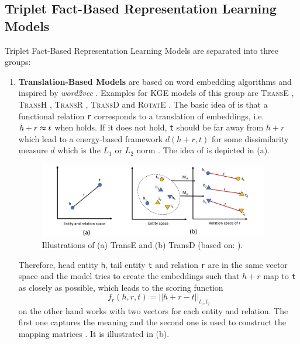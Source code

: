 \subsection{Triplet Fact-Based Representation Learning Models} 
\label{subsec:triplet_fact_based_representation_learning_models}

Triplet Fact-Based Representation Learning Models are separated into three groups:
\begin{enumerate}
    \item 
    \textbf{Translation-Based Models} are based on word embedding algorithms and inspired by \textit{word2vec} \cite{electronics9050750}.
    Examples for \ac{KGE} models of this group are \textsc{TransE} \cite{TransE}, \textsc{TransH} \cite{TransH}, \textsc{TransR} \cite{TransR}, \textsc{TransD} \cite{TransD}
    and 
    \textsc{RotatE} \cite{RotatE}.
    The basic idea of \transe is that a functional relation \texttt{r} corresponds to a translation of embeddings, i.e. $h + r \thickapprox t$ when  holds.
    If it does not hold, \texttt{t} should be far away from $h + r$ which lead to a energy-based framework $d(h+r, t)$ for some dissimilarity measure $d$ which is the $L_1$ or $L_2$ norm \cite{TransE}.
    The idea of \transe is depicted in  (a).
    \begin{figure}[t]
      \centering
        \includegraphics[width=0.95\textwidth]{figures/Transe+TransD.pdf}
      \caption{Illustrations of (a) TransE and (b) TransD (based on: \cite{electronics9050750}).}
      \label{fig:translationbasedmodels}
    \end{figure}
    Therefore, head entity \texttt{h}, tail entity \texttt{t} and relation \texttt{r} are in the same vector space and the model tries to create the embeddings such that $h+r$ map to \texttt{t} as closely as possible, which leads to the scoring function
    \begin{equation}
        f_r(h,r,t) = || h + r - t ||_{l_1, l_2}
        \label{eq:transescoringfunction}
    \end{equation}
    \transd on the other hand works with two vectors for each entity and relation.
    The first one captures the meaning and the second one is used to construct the mapping matrices \cite{TransD}.
    It is illustrated in  (b).
    

\end{enumerate}
